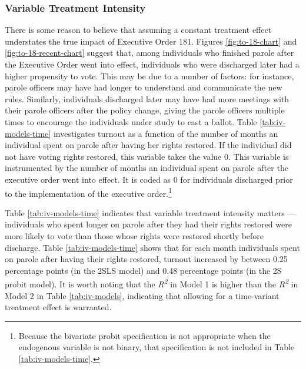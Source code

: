 \documentclass[
  12pt,
]{article}
\begin{document}
\hypertarget{variable-treatment-intensity}{%
\subsubsection*{Variable Treatment Intensity}\label{variable-treatment-intensity}}

There is some reason to believe that assuming a constant treatment effect understates the true impact of Executive Order 181. Figures \ref{fig:to-18-chart} and \ref{fig:to-18-recent-chart} suggest that, among individuals who finished parole after the Executive Order went into effect, individuals who were discharged later had a higher propensity to vote. This may be due to a number of factors: for instance, parole officers may have had longer to understand and communicate the new rules. Similarly, individuals discharged later may have had more meetings with their parole officers after the policy change, giving the parole officers multiple times to encourage the individuals under study to cast a ballot. Table \ref{tab:iv-models-time} investigates turnout as a function of the number of months an individual spent on parole after having her rights restored. If the individual did not have voting rights restored, this variable takes the value 0. This variable is instrumented by the number of months an individual spent on parole after the executive order went into effect. It is coded as 0 for individuals discharged prior to the implementation of the executive order.\footnote{Because the bivariate probit specification is not appropriate when the endogenous variable is not binary, that specification is not included in Table \ref{tab:iv-models-time}.}



Table \ref{tab:iv-models-time} indicates that variable treatment intensity matters --- individuals who spent longer on parole after they had their rights restored were more likely to vote than those whose rights were restored shortly before discharge. Table \ref{tab:iv-models-time} shows that for each month individuals spent on parole after having their rights restored, turnout increased by between 0.25 percentage points (in the 2SLS model) and 0.48 percentage points (in the 2S probit model). It is worth noting that the \emph{R\textsuperscript{2}} in Model 1 is higher than the \emph{R\textsuperscript{2}} in Model 2 in Table \ref{tab:iv-models}, indicating that allowing for a time-variant treatment effect is warranted.
\end{document}
